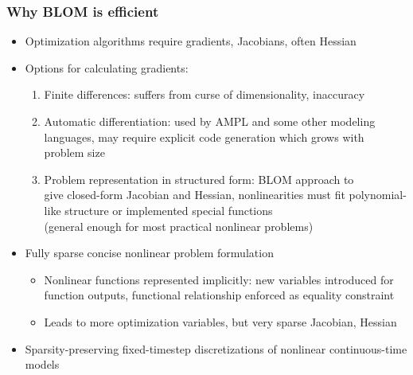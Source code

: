 \documentclass[mathserif]{beamer}
\begin{document}
\begin{frame}
\frametitle{Why BLOM is efficient}
\begin{itemize}
\item Optimization algorithms require gradients, Jacobians, often Hessian
\item Options for calculating gradients:
\begin{enumerate}
\item Finite differences: suffers from curse of dimensionality, inaccuracy
\item Automatic differentiation: used by AMPL and some other modeling languages, may require explicit code generation which grows with problem size
\item Problem representation in structured form: BLOM approach to \\
give closed-form Jacobian and Hessian, nonlinearities must fit polynomial-like structure or implemented special functions \\
(general enough for most practical nonlinear problems)
\end{enumerate}
\item Fully sparse concise nonlinear problem formulation
\begin{itemize}
\item Nonlinear functions represented implicitly: new variables introduced for function outputs, functional relationship enforced as equality constraint
\item Leads to more optimization variables, but very sparse Jacobian, Hessian
\end{itemize}
\item Sparsity-preserving fixed-timestep discretizations of nonlinear continuous-time models

\end{itemize}



\end{frame}
\end{document}
